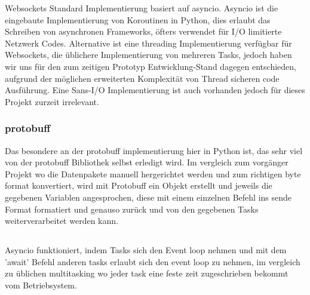 Websockets Standard Implementierung basiert auf asyncio.
%  
Asyncio ist die eingebaute Implementierung von Koroutinen in Python,
dies erlaubt das Schreiben von asynchronen Frameworks, 
öfters verwendet für I/O limitierte Netzwerk Codes.
Alternative ist eine threading Implementierung verfügbar für Websockets, 
die üblichere Implementierung von mehreren Tasks, 
jedoch haben wir uns für den zum zeitigen Prototyp Entwicklung-Stand dagegen entschieden,
aufgrund der möglichen erweiterten Komplexität von Thread sicheren code Ausführung.
Eine Sans-I/O Implementierung ist auch vorhanden jedoch für dieses Projekt zurzeit irrelevant.

\subsubsection{protobuff}
Das besondere an der protobuff implementierung hier in Python ist,
das sehr viel von der protobuff Bibliothek selbst erledigt wird.
Im vergleich zum vorgänger Projekt wo die Datenpakete manuell hergerichtet werden
und zum richtigen byte format konvertiert, wird mit Protobuff ein Objekt erstellt 
und jeweils die gegebenen Variablen angesprochen, 
diese mit einem einzelnen Befehl ins sende Format formatiert und genauso zurück
und von den gegebenen Tasks weiterverarbeitet werden kann.


\subsection{}

Asyncio funktioniert, indem Tasks sich den Event loop nehmen und mit dem 'await' 
Befehl anderen tasks erlaubt sich den event loop zu nehmen, im vergleich zu üblichen multitasking
wo jeder task eine feste zeit zugeschrieben bekommt vom Betriebsystem.

